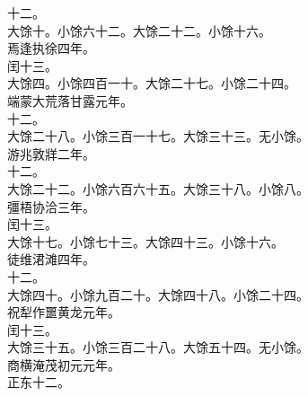 \documentclass{zhvt-classic}
\begin{document}
\hspace*{2em}十二。\\
\hspace*{2em}大馀十。小馀六十二。大馀二十二。小馀十六。\\
\hspace*{2em}焉逢执徐四年。\\
\hspace*{2em}闰十三。\\
\hspace*{2em}大馀四。小馀四百一十。大馀二十七。小馀二十四。\\
\hspace*{2em}端蒙大荒落甘露元年。\\
\hspace*{2em}十二。\\
\hspace*{2em}大馀二十八。小馀三百一十七。大馀三十三。无小馀。\\
\hspace*{2em}游兆敦牂二年。\\
\hspace*{2em}十二。\\
\hspace*{2em}大馀二十二。小馀六百六十五。大馀三十八。小馀八。\\
\hspace*{2em}彊梧协洽三年。\\
\hspace*{2em}闰十三。\\
\hspace*{2em}大馀十七。小馀七十三。大馀四十三。小馀十六。\\
\hspace*{2em}徒维涒滩四年。\\
\hspace*{2em}十二。\\
\hspace*{2em}大馀四十。小馀九百二十。大馀四十八。小馀二十四。\\
\hspace*{2em}祝犁作噩黄龙元年。\\
\hspace*{2em}闰十三。\\
\hspace*{2em}大馀三十五。小馀三百二十八。大馀五十四。无小馀。\\
\hspace*{2em}商横淹茂初元元年。\\
\hspace*{2em}正东十二。\\
\end{document}
